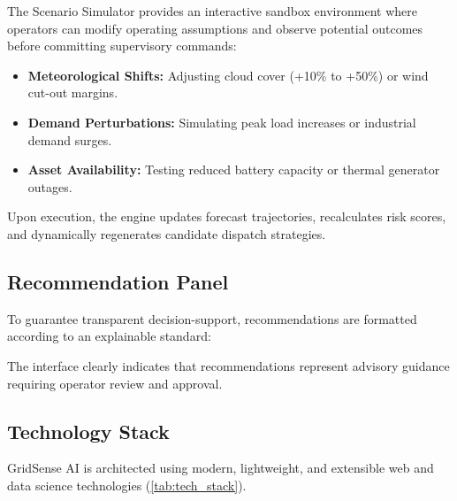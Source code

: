 The Scenario Simulator provides an interactive sandbox environment where operators can modify operating assumptions and observe potential outcomes before committing supervisory commands:
\begin{itemize}[leftmargin=1.8em, itemsep=0.2em]
    \item \textbf{Meteorological Shifts:} Adjusting cloud cover (+10\% to +50\%) or wind cut-out margins.
    \item \textbf{Demand Perturbations:} Simulating peak load increases or industrial demand surges.
    \item \textbf{Asset Availability:} Testing reduced battery capacity or thermal generator outages.
\end{itemize}
Upon execution, the engine updates forecast trajectories, recalculates risk scores, and dynamically regenerates candidate dispatch strategies.

\subsection{Recommendation Panel}
\label{subsec:recommendation_panel}

To guarantee transparent decision-support, recommendations are formatted according to an explainable standard:
\begin{center}
\end{center}
The interface clearly indicates that recommendations represent advisory guidance requiring operator review and approval.

\subsection{Technology Stack}
\label{subsec:technology_stack}

GridSense AI is architected using modern, lightweight, and extensible web and data science technologies (\cref{tab:tech_stack}).


